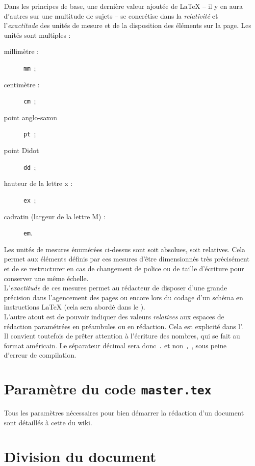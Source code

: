 \documentclass[a4paper, 11pt, twoside, fleqn]{memoir}
\begin{document}
Dans les principes de base, une dernière valeur ajoutée de \LaTeX{} -- il y en aura d'autres sur une multitude de sujets -- se concrétise dans la \emph{relativité} et l'\emph{exactitude} des unités de mesure et de la disposition des éléments sur la page. Les unités sont multiples : 
\begin{description}
\item[millimètre :] \texttt{mm} \,;
\item[centimètre :] \texttt{cm} \,;
\item[point anglo-saxon] \texttt{pt} \,;
\item[point Didot] \texttt{dd} \,;
\item[hauteur de la lettre x :] \texttt{ex} \,;
\item[cadratin (largeur de la lettre M) :] \texttt{em}.
\end{description}

Les unités de mesures énumérées ci-dessus sont soit absolues, soit relatives. Cela permet aux éléments définis par ces mesures d'être dimensionnés très précisément et de se restructurer en cas de changement de police ou de taille d'écriture pour conserver une même échelle.\\ 
L'\emph{exactitude} de ces mesures permet au rédacteur de disposer d'une grande précision dans l'agencement des pages ou encore lors du codage d'un schéma en instructions \LaTeX{} (cela sera abordé dans le \superref{}).\\
L'autre atout est de pouvoir indiquer des valeurs \emph{relatives} aux espaces de rédaction paramétrées en préambules ou en rédaction. Cela est explicité dans l'.\\
Il convient toutefois de prêter attention à l'écriture des nombres, qui se fait au format américain. Le séparateur décimal sera donc \texttt{.} et non \texttt{,} , sous peine d'erreur de compilation.\\
	
	\section{Paramètre du code \texttt{master.tex}}

	Tous les paramètres nécessaires pour bien démarrer la rédaction d'un document sont détaillés à cette  du wiki.\\
		
	\section{Division du document}
	
\end{document}
